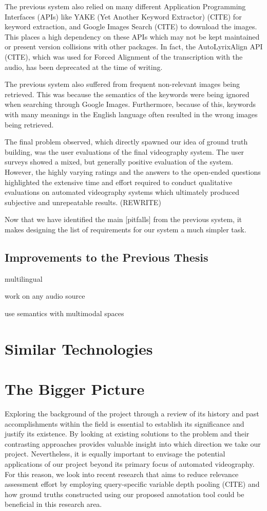 \documentclass{l4proj}
\begin{document}
The previous system also relied on many different Application Programming Interfaces (APIs) like YAKE (Yet Another Keyword Extractor) \cite{yake}(CITE) for keyword extraction, and Google Images Search \cite{google_images}(CITE) to download the images. This places a high dependency on these APIs which may not be kept maintained or present version collisions with other packages. In fact, the AutoLyrixAlign API \cite{autolyrixalign}(CITE), which was used for Forced Alignment of the transcription with the audio, has been deprecated at the time of writing.

The previous system also suffered from frequent non-relevant images being retrieved. This was because the semantics of the keywords were being ignored when searching through Google Images. Furthermore, because of this, keywords with many meanings in the English language often resulted in the wrong images being retrieved. 

The final problem observed, which directly spawned our idea of ground truth building, was the user evaluations of the final videography system. The user surveys showed a mixed, but generally positive evaluation of the system. However, the highly varying ratings and the answers to the open-ended questions highlighted the extensive time and effort required to conduct qualitative evaluations on automated videography systems which ultimately produced subjective and unrepeatable results. (REWRITE)

Now that we have identified the main [pitfalls] from the previous system, it makes designing the list of requirements for our system a much simpler task.

\subsection{Improvements to the Previous Thesis}
multilingual

work on any audio source

use semantics with multimodal spaces



\section{Similar Technologies}



\section{The Bigger Picture}
Exploring the background of the project through a review of its history and past accomplishments within the field is essential to establish its significance and justify its existence. By looking at existing solutions to the problem and their contrasting approaches provides valuable insight into which direction we take our project. Nevertheless, it is equally important to envisage the potential applications of our project beyond its primary focus of automated videography. For this reason, we look into recent research that aims to reduce relevance assessment effort by employing query-specific variable depth pooling (CITE) and how ground truths constructed using our proposed annotation tool could be beneficial in this research area.
\end{document}
